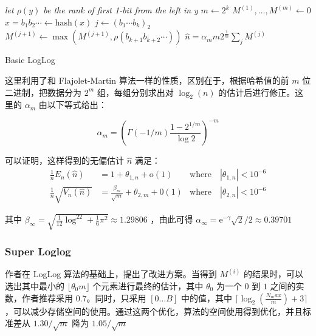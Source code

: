 \documentclass{ctexart}
\begin{document}
    \begin{algorithm}
        \BlankLine
        \emph{let $\rho(y)$ be the rank of first 1-bit from the left in y}\;
        $m \leftarrow 2^k$\;
        $M^{(1)},\ldots ,M^{(m)} \leftarrow 0$\;
         {
            $x = b_1b_2 \cdots \leftarrow \mathrm{hash}(x)$\;
            $j \leftarrow (b_1\cdots b_k)_2$\;
            $M^{(j+1)} \leftarrow \max(M^{(j+1)}, \rho(b_{k+1}b_{k+2}\cdots))$\;
        }
        $\hat{n} = \alpha_mm2^{\frac1m}\sum_j{M^{(j)}}$\;
        \caption{Basic LogLog}
    \end{algorithm}

    这里利用了和 Flajolet-Martin 算法一样的性质，区别在于，根据哈希值的前 $m$ 位二进制，把数据分为 $2^m$ 组，每组分别求出对 $\log_2(n)$ 的估计后进行修正。这里的 $\alpha_m$ 由以下等式给出：

    \begin{equation*}
        \alpha_m = (\Gamma(-1/m)\frac{1-2^{1/m}}{\log{2}})^{-m}
    \end{equation*}

    可以证明\cite{Durand:2003je}，这样得到的无偏估计 $\hat{n}$ 满足：
    \begin{align*}
        \frac1nE_n(\hat{n}) &= 1 + \theta_{1,n}+\mathrm{o}(1) & \mathrm{where} \quad |\theta_{1,n}| < 10^{-6} \\
        \frac1n\sqrt{V_n(\hat{n})} &= \frac{\beta_m}{\sqrt{m}} + \theta_{2,m} + \mathrm{0}(1) & \mathrm{where} \quad |\theta_{2,n}| < 10^{-6}
    \end{align*}

    其中 $\beta_{\infty} = \sqrt{\frac1{12}\log^22+\frac16\pi^2} \approx 1.29806$ ，由此可得 $\alpha_{\infty} = \mathrm{e}^{-\gamma}\sqrt2/2 \approx 0.39701$

\subsubsection{Super Loglog}
    作者在 LogLog 算法的基础上，提出了改进方案。当得到 $M^{(i)}$ 的结果时，可以选出其中最小的 $\lfloor \theta_0 m \rfloor$ 个元素进行最终的估计，其中 $\theta_0$ 为一个 $0$ 到 $1$ 之间的实数，作者推荐采用 $0.7$。同时，只采用 $[0 \ldots B]$ 中的值，其中 $\lceil \log_2(\frac{N_max}m)+3 \rceil$ ，可以减少存储空间的使用。通过这两个优化，算法的空间使用得到优化，并且标准差从 $1.30/\sqrt{m}$ 降为 $1.05/\sqrt{m}$ 
\end{document}

